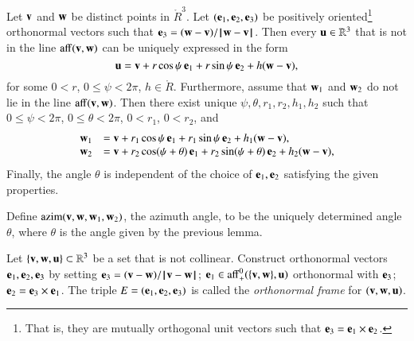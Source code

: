 \begin{lemma}
Let ${\mathbf v}$ and ${\mathbf w}$ be distinct points in 
$\ring{R}^3$.  Let $({\mathbf e}_1,{\mathbf e}_2,{\mathbf e}_3)$ be positively oriented\footnote{That is, they are mutually orthogonal unit vectors such that ${\mathbf e}_3 = {\mathbf e}_1 \times {\mathbf e}_2$.} orthonormal
vectors such that ${\mathbf e}_3 = ({\mathbf w}-{\mathbf v})/{\hskip0.1em|\hskip-0.15em|\hskip0.1em}{\mathbf w} - {\mathbf v}{\hskip0.1em|\hskip-0.15em|\hskip0.1em}$.
Then every
${\mathbf u}\in\mathbb{R}^3$ that is not in the line ${\operatorname{aff}}({\mathbf v},{\mathbf w})$
can be uniquely expressed in the form
   $$
   {\mathbf u} = {\mathbf v} + r\cos\psi\, {\mathbf e}_1 + r\sin\psi\, {\mathbf e}_2 + h ({\mathbf w}-{\mathbf v}),
   $$
%
%
for some $0< r$, $0\le \psi < 2\pi$, $h\in\ring{R}$.
Furthermore,
assume that ${\mathbf w}_1$ and ${\mathbf w}_2$ do
not lie in the line ${\operatorname{aff}}({\mathbf v},{\mathbf w})$.
Then there exist unique $\psi,\theta,r_1,r_2,h_1,h_2$
 such
that $0\le\psi<2\pi$, $0\le\theta < 2\pi$, $0 < r_1$, $0 < r_2$, and
  $$
  \begin{array}{lll}
    {\mathbf w}_1 &= {\mathbf v} + r_1\cos\psi\, {\mathbf e}_1 + r_1\sin\psi\, {\mathbf e}_2 + h_1({\mathbf w}-{\mathbf v}),\\
    {\mathbf w}_2 &= {\mathbf v} + r_2\cos(\psi+\theta)\, {\mathbf e}_1 + r_2\sin(\psi+\theta)\, {\mathbf e}_2 
     + h_2({\mathbf w}-{\mathbf v}),\\
\end{array}
  $$
Finally, the angle $\theta$ is independent of the choice of ${\mathbf e}_1,{\mathbf e}_2$
satisfying the given properties.
\end{lemma}
%
%
%
%
%
%

\begin{definition}[azim] 
Define ${\operatorname{azim}}({\mathbf v},{\mathbf w},{\mathbf w}_1,{\mathbf w}_2)$, the azimuth angle, 
to be the uniquely determined
angle $\theta$, where $\theta$ is the angle given by the previous
lemma.
%
%
%
\end{definition}

\begin{definition}[frame]
Let $\{{\mathbf v},{\mathbf w},{\mathbf u}\}\subset\mathbb{R}^3$ be a set that is not collinear.
Construct orthonormal vectors  ${\mathbf e}_1,{\mathbf e}_2,{\mathbf e}_3$ by setting
${\mathbf e}_3 = ({\mathbf v}-{\mathbf w})/{\hskip0.1em|\hskip-0.15em|\hskip0.1em}{\mathbf v} - {\mathbf w}{\hskip0.1em|\hskip-0.15em|\hskip0.1em}$; 
${\mathbf e}_1\in{\operatorname{aff}}_+^0(\{{\mathbf v},{\mathbf w}\},{\mathbf u})$ orthonormal with ${\mathbf e}_3$;
${\mathbf e}_2 = {\mathbf e}_3\times {\mathbf e}_1$.
 The triple $E=({\mathbf e}_1,{\mathbf e}_2,{\mathbf e}_3)$ is called
the {\it orthonormal frame} for $({\mathbf v},{\mathbf w},{\mathbf u})$.
\end{definition}
%

